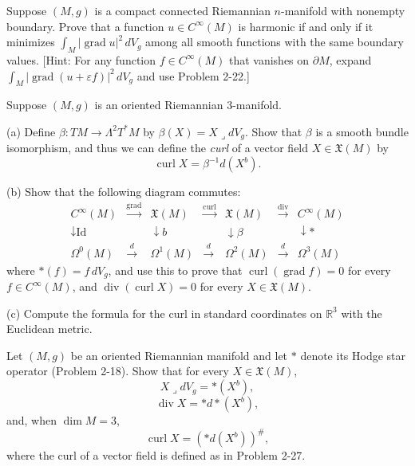 \begin{exercise}
\label{prob:dirichlet-principle}
Suppose $(M,g)$ is a compact connected Riemannian $n$-manifold with nonempty boundary. Prove that a function $u \in C^{\infty}(M)$ is harmonic if and only if it minimizes $\int_M |\operatorname{grad} u|^2 \, dV_g$ among all smooth functions with the same boundary values. [Hint: For any function $f \in C^{\infty}(M)$ that vanishes on $\partial M$, expand $\int_M |\operatorname{grad}(u + \varepsilon f)|^2 \, dV_g$ and use Problem 2-22.]
\end{exercise}

\begin{exercise}
\label{prob:curl-vector-field}
Suppose $(M,g)$ is an oriented Riemannian 3-manifold.

(a) Define $\beta : TM \to \Lambda^2 T^* M$ by $\beta(X) = X \mathbin{\lrcorner} dV_g$. Show that $\beta$ is a smooth bundle isomorphism, and thus we can define the \emph{curl} of a vector field $X \in \mathfrak{X}(M)$ by
\[
\operatorname{curl} X = \beta^{-1} d(X^b).
\]

(b) Show that the following diagram commutes:
\[
\begin{array}{ccccccc}
C^{\infty}(M) & \xrightarrow{\operatorname{grad}} & \mathfrak{X}(M) & \xrightarrow{\operatorname{curl}} & \mathfrak{X}(M) & \xrightarrow{\operatorname{div}} & C^{\infty}(M) \\
\downarrow \text{Id} & & \downarrow b & & \downarrow \beta & & \downarrow * \\
\Omega^0(M) & \xrightarrow{d} & \Omega^1(M) & \xrightarrow{d} & \Omega^2(M) & \xrightarrow{d} & \Omega^3(M)
\end{array}
\]
where $*(f) = f \, dV_g$, and use this to prove that $\operatorname{curl}(\operatorname{grad} f) = 0$ for every $f \in C^{\infty}(M)$, and $\operatorname{div}(\operatorname{curl} X) = 0$ for every $X \in \mathfrak{X}(M)$.

(c) Compute the formula for the curl in standard coordinates on $\mathbb{R}^3$ with the Euclidean metric.
\end{exercise}

\begin{exercise}
\label{prob:hodge-star-exterior-derivative}
Let $(M,g)$ be an oriented Riemannian manifold and let $*$ denote its Hodge star operator (Problem 2-18). Show that for every $X \in \mathfrak{X}(M)$,
\[
X \mathbin{\lrcorner} dV_g = *(X^b),
\]
\[
\operatorname{div} X = *d*(X^b),
\]
and, when $\dim M = 3$,
\[
\operatorname{curl} X = (*d(X^b))^{\#},
\]
where the curl of a vector field is defined as in Problem 2-27.
\end{exercise}

